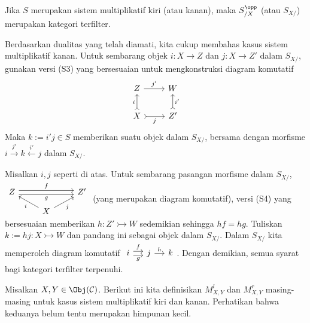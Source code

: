 \begin{lema}\label{prop:S-filtered}
	Jika $S$ merupakan sistem multiplikatif kiri (atau kanan), maka
	$S_{/X}^{\opp}$ (atau $S_{X/}$) merupakan kategori terfilter.
\end{lema}
\begin{bukti}
	Berdasarkan dualitas yang telah diamati, kita cukup membahas kasus sistem
	multiplikatif kanan. Untuk sembarang objek $i: X \to Z$ dan
	$j: X \to Z'$ dalam $S_{X/}$, gunakan versi (S3) yang bersesuaian untuk
	mengkonstruksi diagram komutatif
	\[\begin{tikzcd}
		Z \arrow[r, "{j'}"] & W \\
		X \arrow[rightarrowtail, u, "i"] \arrow[rightarrowtail, r, "j"'] & Z' \arrow[rightarrowtail, u, "{i'}"']
	\end{tikzcd}\]
	Maka $k := i'j \in S$ memberikan suatu objek dalam $S_{X/}$, bersama
	dengan morfisme $i \xrightarrow{j'} k \xleftarrow{i'} j$ dalam $S_{X/}$.

	Misalkan $i,j$ seperti di atas. Untuk sembarang pasangan morfisme
	dalam $S_{X/}$,
	$\begin{tikzcd}[row sep=small]
		Z \arrow[shift left, rr, "f"] \arrow[shift right, rr, "g"'] & & Z' \\
		& X \arrow[lu, "i"] \arrow[ru, "j"'] &
	\end{tikzcd}$
	(yang merupakan diagram komutatif), versi (S4) yang bersesuaian
	memberikan $h: Z' \rightarrowtail W$ sedemikian sehingga $hf = hg$.
	Tuliskan $k := hj: X \rightarrowtail W$ dan pandang ini sebagai objek
	dalam $S_{X/}$. Dalam $S_{X/}$ kita memperoleh diagram komutatif
	$\begin{tikzcd}[column sep=small]
		i \arrow[shift left, r, "f"] \arrow[shift right, r, "g"'] & j \arrow[r, "h"] & k
	\end{tikzcd}$.
	Dengan demikian, semua syarat bagi kategori terfilter terpenuhi.
\end{bukti}	

Misalkan $X, Y \in \Obj(\mathcal{C})$. Berikut ini kita definisikan
$M_{X,Y}^l$ dan $M_{X,Y}^r$ masing-masing untuk kasus sistem multiplikatif
kiri dan kanan. Perhatikan bahwa keduanya belum tentu merupakan himpunan
kecil.

